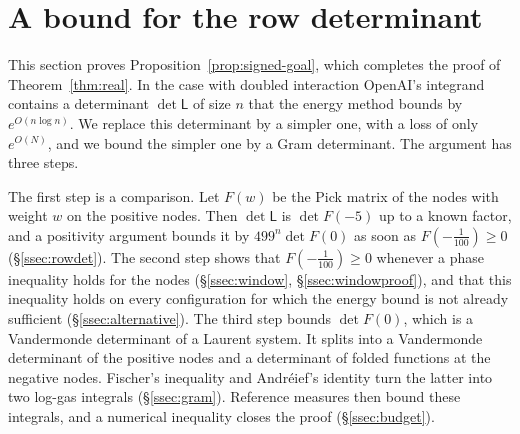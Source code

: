 \section{A bound for the row determinant}\label{sec:signed}

This section proves Proposition~\ref{prop:signed-goal}, which completes the proof of Theorem~\ref{thm:real}.
In the case with doubled interaction OpenAI's integrand contains a determinant $\det\mathsf L$ of size $n$
that the energy method bounds by $e^{O(n\log n)}$. We replace this determinant by a simpler one, with a loss of only
$e^{O(N)}$, and we bound the simpler one by a Gram determinant. The argument has three steps.

The first step is a comparison. Let $F(w)$ be the Pick matrix of the nodes with weight $w$ on the positive
nodes. Then $\det\mathsf L$ is $\det F(-5)$ up to a known factor, and a positivity argument bounds it by
$499^n\det F(0)$ as soon as $F(-\frac1{100})\ge0$ (\S\ref{ssec:rowdet}). The second step shows that
$F(-\frac1{100})\ge0$ whenever a phase inequality holds for the nodes (\S\ref{ssec:window},
\S\ref{ssec:windowproof}), and that this inequality holds on every configuration for which the energy bound
is not already sufficient (\S\ref{ssec:alternative}). The third step bounds $\det F(0)$, which is a Vandermonde
determinant of a Laurent system. It splits into a Vandermonde determinant of the positive nodes and a
determinant of folded functions at the negative nodes. Fischer's inequality and Andr\'eief's identity turn
the latter into two log-gas integrals (\S\ref{ssec:gram}). Reference measures then bound these integrals,
and a numerical inequality closes the proof (\S\ref{ssec:budget}).

